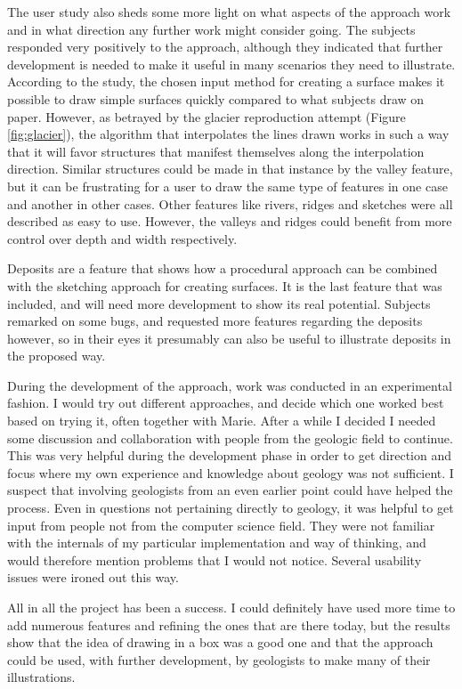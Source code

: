 \documentclass[a4paper,12pt]{report}
\begin{document}
The user study also sheds some more light on what aspects of the approach work and in what direction any further work might consider going. The subjects responded very positively to the approach, although they indicated that further development is needed to make it useful in many scenarios they need to illustrate. According to the study, the chosen input method for creating a surface makes it possible to draw simple surfaces quickly compared to what subjects draw on paper. However, as betrayed by the glacier reproduction attempt (Figure \ref{fig:glacier}), the algorithm that interpolates the lines drawn works in such a way that it will favor structures that manifest themselves along the interpolation direction. Similar structures could be made in that instance by the valley feature, but it can be frustrating for a user to draw the same type of features in one case and another in other cases. Other features like rivers, ridges and sketches were all described as easy to use. However, the valleys and ridges could benefit from 
more control over depth and width respectively. 

Deposits are a feature that shows how a procedural approach can be combined with the sketching approach for creating surfaces. It is the last feature that was included, and will need more development to show its real potential. Subjects remarked on some bugs, and requested more features regarding the deposits however, so in their eyes it presumably can also be useful to illustrate deposits in the proposed way. 

During the development of the approach, work was conducted in an experimental fashion. I would try out different approaches, and decide which one worked best based on trying it, often together with Marie. After a while I decided I needed some discussion and collaboration with people from the geologic field to continue. This was very helpful during the development phase in order to get direction and focus where my own experience and knowledge about geology was not sufficient. I suspect that involving geologists from an even earlier point could have helped the process. Even in questions not pertaining directly to geology, it was helpful to get input from people not from the computer science field. They were not familiar with the internals of my particular implementation and way of thinking, and would therefore mention problems that I would not notice. Several usability issues were ironed out this way.

All in all the project has been a success. I could definitely have used more time to add numerous features and refining the ones that are there today, but the results show that the idea of drawing in a box was a good one and that the approach could be used, with further development, by geologists to make many of their illustrations.
\end{document}
